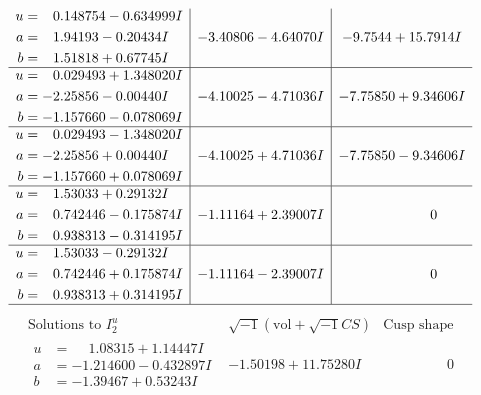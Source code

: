 \documentclass[1p]{elsarticle_modified}
\theoremstyle{definition}
\newcommand{\I}{\sqrt{-1}}
\begin{document}
$$\begin{array}{c|c|c}
\begin{aligned}
u &= \phantom{-}0.148754 - 0.634999 I \\
a &= \phantom{-}1.94193 - 0.20434 I \\
b &= \phantom{-}1.51818 + 0.67745 I\end{aligned}
 & -3.40806 - 4.64070 I & -9.7544 + 15.7914 I \\ \hline\begin{aligned}
u &= \phantom{-}0.029493 + 1.348020 I \\
a &= -2.25856 - 0.00440 I \\
b &= -1.157660 - 0.078069 I\end{aligned}
 & -4.10025 - 4.71036 I & -7.75850 + 9.34606 I \\ \hline\begin{aligned}
u &= \phantom{-}0.029493 - 1.348020 I \\
a &= -2.25856 + 0.00440 I \\
b &= -1.157660 + 0.078069 I\end{aligned}
 & -4.10025 + 4.71036 I & -7.75850 - 9.34606 I \\ \hline\begin{aligned}
u &= \phantom{-}1.53033 + 0.29132 I \\
a &= \phantom{-}0.742446 - 0.175874 I \\
b &= \phantom{-}0.938313 - 0.314195 I\end{aligned}
 & -1.11164 + 2.39007 I & \phantom{-0.000000 } 0 \\ \hline\begin{aligned}
u &= \phantom{-}1.53033 - 0.29132 I \\
a &= \phantom{-}0.742446 + 0.175874 I \\
b &= \phantom{-}0.938313 + 0.314195 I\end{aligned}
 & -1.11164 - 2.39007 I & \phantom{-0.000000 } 0\\
 \hline 
 \end{array}$$\newpage$$\begin{array}{c|c|c}  
\text{Solutions to }I^u_{2}& \I (\text{vol} + \sqrt{-1}CS) & \text{Cusp shape}\\
 \hline 
\begin{aligned}
u &= \phantom{-}1.08315 + 1.14447 I \\
a &= -1.214600 - 0.432897 I \\
b &= -1.39467 + 0.53243 I\end{aligned}
 & -1.50198 + 11.75280 I & \phantom{-0.000000 } 0 \\ \hline\begin{aligned}

\end{aligned}
\end{array}$$
\end{document}
